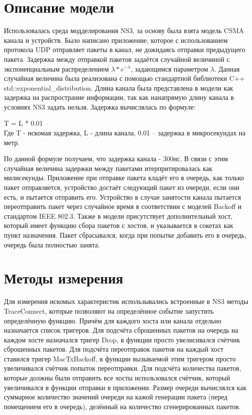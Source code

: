 \documentclass[a4peper, 12pt, titlepage, finall]{extreport}
\begin{document}
    \section{Описание модели}
        Использовалась среда модделирования NS3, за основу была взята модель CSMA канала и устройств.
        Было написано приложение, которое с использованием протокола UDP отправляет пакеты в канал, не дожидаясь отправки предыдущего пакета.
        Задержка между отправкой пакетов задаётся случайной величиной с экспоненциальным распределением {\ttfamily$\lambda*e^{-\lambda}$}, 
        задающимся параметром {\ttfamily$\lambda$}. Данная случайная величина была реализована с помощью стандартной библиотеки C++\\
        {\ttfamily std::exponential\_distribution}. Длина канала была представлена в модели как задержка на распространие информации,
        так как нанапрямую длину канала в условиях NS3 задать нельзя. Задержка вычислялась по формуле:
        \begin{center}
            {\ttfamily T = L * 0.01}\\
            Где T - искомая задержка, L - длина канала, 0.01 -- задержка в микросекундах на метр.
        \end{center}
        По данной формуле получаем, что задержка канала - 300нс. В связи с этим случайная величина задержки между пакетами итерпритировалась как 
        милисекунды. Приложение при отправке пакета кладёт его в очередь, как только пакет отправляется,
        устройство достаёт следующий пакет из очереди, если они есть, и пытается отправить его. Устройство в случае занятости канала пытается переотправить
        пакет через случайное время в соответствии с моделей Backoff и стандартом {\ttfamily IEEE 802.3}. Также в модели присутствует дополнительный хост,
        который имеет функцию сбора пакетов с хостов, и указывается в сокетах как пункт назначения. Пакет сбрасывался, когда при попытке добавить его в очередь, очередь была полностью занята.
    \section{Методы измерения}
        Для измерения искомых характеристик использывались встроенные в NS3 методы {\ttfamily TraceConnect}, которые позволяют на определённое 
        событие запустить определённую функцию. Причём для каждого хоста или канала отдельно назначается список тригеров. Для подсчёта сброшенных пакетов
        на очередь на каждом хосте назначался тригер {\ttfamily Drop}, в функции просто увелисивался счётчик сброшенных пакетов. Для подсчёта
        переотправок пакетов на каждый хост ставился тригер {\ttfamily MacTxBackoff}, в функции вызываемой этим тригером просто увеличивался счётчик попыток переотправки.
        Для подсчёта количества пакетов, которые должны были отправить все хосты использовался счётчик, который увеличивался в функции отправки в приложении.
        Размер очереди вычислялся как суммарное количество значений очереди на кажой генерации пакета (перед помещением его в очередь), 
        делённый на количество сгенерированных пакетов.
    \newpage
\end{document}
